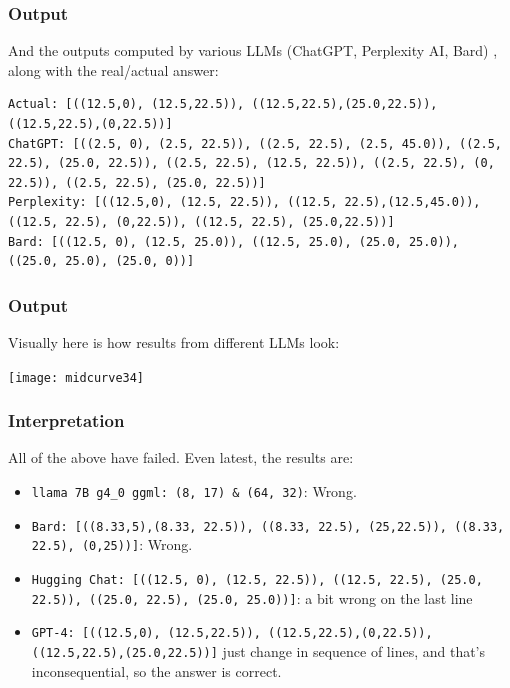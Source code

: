 \begin{frame}[fragile]\frametitle{Output}
And the outputs computed by various LLMs (ChatGPT, Perplexity AI, Bard) , along with the real/actual answer:

\begin{lstlisting}
Actual: [((12.5,0), (12.5,22.5)), ((12.5,22.5),(25.0,22.5)), ((12.5,22.5),(0,22.5))]
ChatGPT: [((2.5, 0), (2.5, 22.5)), ((2.5, 22.5), (2.5, 45.0)), ((2.5, 22.5), (25.0, 22.5)), ((2.5, 22.5), (12.5, 22.5)), ((2.5, 22.5), (0, 22.5)), ((2.5, 22.5), (25.0, 22.5))]
Perplexity: [((12.5,0), (12.5, 22.5)), ((12.5, 22.5),(12.5,45.0)), ((12.5, 22.5), (0,22.5)), ((12.5, 22.5), (25.0,22.5))]
Bard: [((12.5, 0), (12.5, 25.0)), ((12.5, 25.0), (25.0, 25.0)), ((25.0, 25.0), (25.0, 0))]
\end{lstlisting}	
\end{frame}

\begin{frame}[fragile]\frametitle{Output}

Visually here is how results from different LLMs look:

\begin{center}
\texttt{[image: midcurve34]}
\end{center}	
\end{frame}

\begin{frame}[fragile]\frametitle{Interpretation}

All of the above have failed. Even latest, the results are:
\begin{itemize}
\item \lstinline|llama 7B g4_0 ggml: (8, 17) & (64, 32)|: Wrong.
\item \lstinline|Bard: [((8.33,5),(8.33, 22.5)), ((8.33, 22.5), (25,22.5)), ((8.33, 22.5), (0,25))]|: Wrong.
\item \lstinline|Hugging Chat: [((12.5, 0), (12.5, 22.5)), ((12.5, 22.5), (25.0, 22.5)), ((25.0, 22.5), (25.0, 25.0))]|: a bit wrong on the last line
\item \lstinline|GPT-4: [((12.5,0), (12.5,22.5)), ((12.5,22.5),(0,22.5)), ((12.5,22.5),(25.0,22.5))]| just change in sequence of lines, and that's inconsequential, so the answer is correct.
\end{itemize}	
\end{frame}

